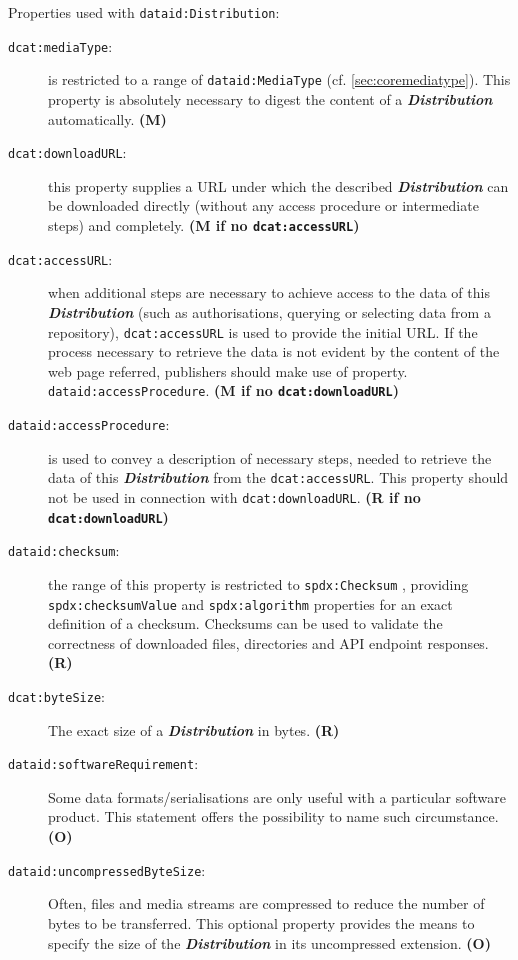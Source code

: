 \documentclass[a4paper,english,twoside,BCOR1.5cm,headsepline,DIV12,appendixprefix,final,12pt]{scrbook}
\newcommand{\prop}[1]{{{\texttt{#1}}}}
\newcommand{\important}[1]{\textbf{\textit{#1}}}
\begin{document}
Properties used with \prop{dataid:Distribution}:
\begin{description}
\item[\prop{dcat:mediaType}:] is restricted to a range of \prop{dataid:MediaType} (cf. \cref{sec:coremediatype}). This property is absolutely necessary to digest the content of a \important{Distribution} automatically. \textbf{(M)}
\item[\prop{dcat:downloadURL}:] this property supplies a URL under which the described \important{Distribution} can be downloaded directly (without any access procedure or intermediate steps) and completely. \textbf{(M if no \prop{dcat:accessURL})}
\item[\prop{dcat:accessURL}:] when additional steps are necessary to achieve access to the data of this \important{Distribution} (such as authorisations, querying or selecting data from a repository), \prop{dcat:accessURL} is used to provide the initial URL. If the process necessary to retrieve the data is not evident by the content of the web page referred, publishers should make use of property. \prop{dataid:accessProcedure}. \textbf{(M if no \prop{dcat:downloadURL})}
\item[\prop{dataid:accessProcedure}:] is used to convey a description of necessary steps, needed to retrieve the data of this \important{Distribution} from the \prop{dcat:accessURL}. This property should not be used in connection with \prop{dcat:downloadURL}. \textbf{(R if no \prop{dcat:downloadURL})}
\item[\prop{dataid:checksum}:] the range of this property is restricted to \prop{spdx:Checksum} \cite{spdx}, providing \prop{spdx:checksumValue} and \prop{spdx:algorithm} properties for an exact definition of a checksum. Checksums can be used to validate the correctness of downloaded files, directories and API endpoint responses. \textbf{(R)}
\item[\prop{dcat:byteSize}:] The exact size of a \important{Distribution} in bytes. \textbf{(R)}
\item[\prop{dataid:softwareRequirement}:] Some data formats/serialisations are only useful with a particular software product. This statement offers the possibility to name such circumstance. \textbf{(O)}
\item[\prop{dataid:uncompressedByteSize}:] Often, files and media streams are compressed to reduce the number of bytes to be transferred. This optional property provides the means to specify the size of the \important{Distribution} in its uncompressed extension. \textbf{(O)}

\end{description}
\end{document}
